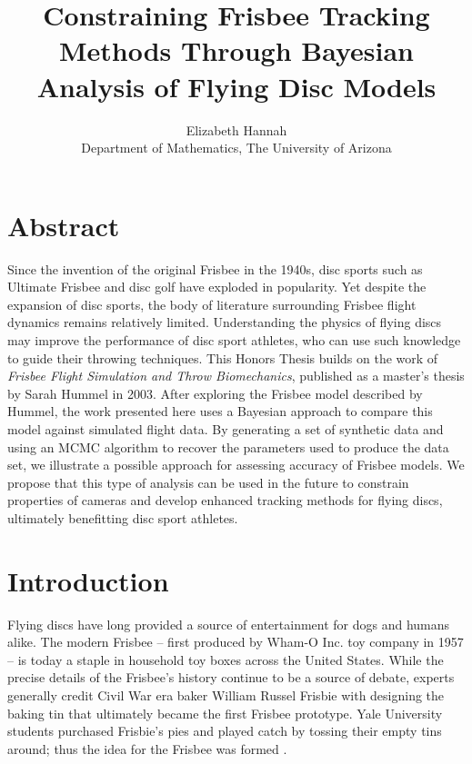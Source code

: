 \documentclass[a4paper,12pt, oneside]{article}
\title{Constraining Frisbee Tracking Methods Through Bayesian Analysis of Flying Disc Models}
\author{Elizabeth Hannah\\Department of Mathematics, The University of Arizona}
\date{}
\begin{document}
\maketitle

\section*{Abstract}
Since the invention of the original Frisbee in the 1940s, disc sports such as Ultimate Frisbee and disc golf have exploded in popularity. Yet despite the expansion of disc sports, the body of literature surrounding Frisbee flight dynamics remains relatively limited. Understanding the physics of flying discs may improve the performance of disc sport athletes, who can use such knowledge to guide their throwing techniques. This Honors Thesis builds on the work of \textit{Frisbee Flight Simulation and Throw Biomechanics}, published as a master's thesis by Sarah Hummel in 2003. After exploring the Frisbee model described by Hummel, the work presented here uses a Bayesian approach to compare this model against simulated flight data. By generating a set of synthetic data and using an MCMC algorithm to recover the parameters used to produce the data set, we illustrate a possible approach for assessing accuracy of Frisbee models. We propose that this type of analysis can be used in the future to constrain properties of cameras and develop enhanced tracking methods for flying discs, ultimately benefitting disc sport athletes.
\section{Introduction}

Flying discs have long provided a source of entertainment for dogs and humans alike.  The modern Frisbee -- first produced by Wham-O Inc. toy company in 1957 -- is today a staple in household toy boxes across the United States.  While the precise details of the Frisbee's history continue to be a source of debate, experts generally credit Civil War era baker William Russel Frisbie with designing the baking tin that ultimately became the first Frisbee prototype.  Yale University students purchased Frisbie's pies and played catch by tossing their empty tins around; thus the idea for the Frisbee was formed \cite{frisorigins}.  
\end{document}
